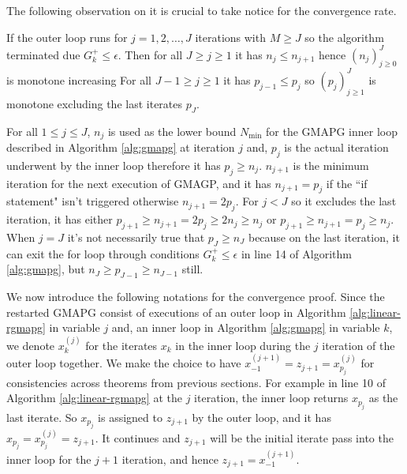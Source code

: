 \documentclass[12pt]{report}
\begin{document}
        The following observation on it is crucial to take notice for the convergence rate. 
        \begin{observation}\label{obs:rgmapg}
            If the outer loop runs for $j = 1, 2, \ldots, J$ iterations with $M \ge J$ so the algorithm terminated due $G_k^+ \le \epsilon$. 
            Then for all $J\ge j\ge 1$ it has $n_{j}\le n_{j + 1}$ hence $(n_j)_{j \ge 0}^J$ is monotone increasing
            For all $J -1 \ge j \ge 1 $ it has $p_{j-1}\le p_{j}$ so $(p_j)_{j \ge 1}^{J}$ is monotone excluding the last iterates $p_J$. 
        \end{observation}
        \par
        For all $1 \le j \le J$, $n_j$ is used as the lower bound $N_{\min}$ for the GMAPG inner loop described in Algorithm \ref{alg:gmapg} at iteration $j$ and, $p_j$ is the actual iteration underwent by the inner loop therefore it has $p_j \ge n_{j}$. 
        $n_{j + 1}$ is the minimum iteration for the next execution of GMAGP, and it has $n_{j + 1} = p_{j}$  if the ``if statement" isn't triggered otherwise $n_{j + 1} = 2p_{j}$. 
        For $j < J$ so it excludes the last iteration, it has either $p_{j + 1} \ge n_{j + 1} = 2p_j \ge 2n_{j} \ge n_j$ or $p_{j + 1} \ge n_{j + 1} = p_j \ge n_j$. 
        When $j = J$ it's not necessarily true that $p_J \ge n_J$ because on the last iteration, it can exit the for loop through conditions $G_k^+ \le \epsilon$ in line 14 of Algorithm \ref{alg:gmapg}, but $n_J \ge p_{J - 1} \ge n_{J - 1}$ still. 
        \par
        We now introduce the following notations for the convergence proof. 
        Since the restarted GMAPG consist of executions of an outer loop in Algorithm \ref{alg:linear-rgmapg} in variable $j$ and, an inner loop in Algorithm \ref{alg:gmapg} in variable $k$, we denote $x_{k}^{(j)}$ for the iterates $x_k$ in the inner loop during the $j$ iteration of the outer loop together. 
        We make the choice to have $x_{-1}^{(j + 1)} = z_{j + 1} = x_{p_j}^{(j)}$ for consistencies across theorems from previous sections. 
        For example in line 10 of Algorithm \ref{alg:linear-rgmapg} at the $j$ iteration, the inner loop returns $x_{p_j}$ as the last iterate. 
        So $x_{p_j}$ is assigned to $z_{j + 1}$ by the outer loop, and it has $x_{p_j} = x_{p_j}^{(j)} = z_{j + 1}$. 
        It continues and $z_{j + 1}$ will be the initial iterate pass into the inner loop for the $j + 1$ iteration, and hence $z_{j + 1} =x_{-1}^{(j + 1)}$. 
        \par
\end{document}
